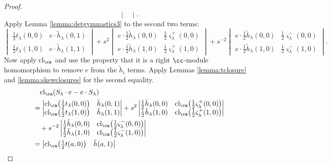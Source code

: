 \begin{proof}
\[\begin{vmatrix}
\end{vmatrix}.
\]
Apply Lemma \ref{lemma:detgymnastics3} to the second two terms:
\[
\begin{vmatrix}
\frac{1}{2} t_\lambda(0,0) & e \cdot \tilde{h}_\lambda(0,1) \\
\frac{1}{2} t_\lambda(1,0) & e \cdot \tilde{h}_\lambda(1,1)
\end{vmatrix}
+ s^2
\begin{vmatrix}
e \cdot \frac{1}{2}\tilde{h}_\lambda(0,0) & \frac{1}{2} \varsigma_\lambda^+(0,0) \\
e \cdot \frac{1}{2}\tilde{h}_\lambda(1,0) & \frac{1}{2} \varsigma_\lambda^+(1,0)
\end{vmatrix}
+ s^{-2}
\begin{vmatrix}
e \cdot \frac{1}{2}\tilde{h}_\lambda(0,0) & \frac{1}{2} \varsigma_\lambda^-(0,0) \\
e \cdot \frac{1}{2}\tilde{h}_\lambda(1,0) & \frac{1}{2} \varsigma_\lambda^-(1,0)
\end{vmatrix}.
\]
Now apply $\cl_\ca$ and use the property that it is a right $\cc$-module homomorphism to remove $e$ from the $\tilde{h}_i$ terms. Apply Lemmas \ref{lemma:tclosure} and \ref{lemma:skewclosures} for the second equality.
\begin{align*}
&\quad \textrm{cl}_\ca ( S_\lambda \cdot e - e \cdot S_\lambda ) \\
&=
\begin{vmatrix}
\cl_\ca \big( \frac{1}{2} t_\lambda(0,0) \big) & \tilde{h}_\lambda(0,1) \\
\cl_\ca \big( \frac{1}{2} t_\lambda(1,0) \big) & \tilde{h}_\lambda(1,1)
\end{vmatrix}
+ s^2
\begin{vmatrix}
\frac{1}{2}\tilde{h}_\lambda(0,0) & \cl_\ca \big( \frac{1}{2} \varsigma_\lambda^+(0,0) \big) \\
\frac{1}{2}\tilde{h}_\lambda(1,0) & \cl_\ca \big( \frac{1}{2} \varsigma_\lambda^+(1,0) \big)
\end{vmatrix} \\
& \quad + s^{-2}
\begin{vmatrix}
\frac{1}{2}\tilde{h}_\lambda(0,0) & \cl_\ca \big( \frac{1}{2} \varsigma_\lambda^-(0,0) \big) \\
\frac{1}{2}\tilde{h}_\lambda(1,0) & \cl_\ca \big( \frac{1}{2} \varsigma_\lambda^-(1,0) \big)
\end{vmatrix} \\
&=
\begin{vmatrix}
\cl_\ca \big( \frac{1}{2} t(a,0) \big) & \tilde{h}(a,1) \\

\end{vmatrix}
\end{align*}
\end{proof}
